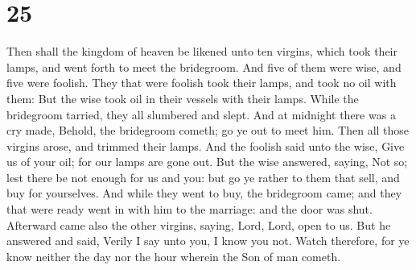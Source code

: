 \hypertarget{section-24}{%
\section{25}\label{section-24}}

 Then shall the kingdom of heaven be likened unto ten
virgins, which took their lamps, and went forth to meet the bridegroom.
 And five of them were wise, and five were foolish.
 They that were foolish took their lamps, and took no oil
with them:  But the wise took oil in their vessels with
their lamps.  While the bridegroom tarried, they all
slumbered and slept.  And at midnight there was a cry
made, Behold, the bridegroom cometh; go ye out to meet him.
 Then all those virgins arose, and trimmed their lamps.
 And the foolish said unto the wise, Give us of your oil;
for our lamps are gone out.  But the wise answered,
saying, Not so; lest there be not enough for us and you: but go ye
rather to them that sell, and buy for yourselves.  And
while they went to buy, the bridegroom came; and they that were ready
went in with him to the marriage: and the door was shut. 
Afterward came also the other virgins, saying, Lord, Lord, open to us.
 But he answered and said, Verily I say unto you, I know
you not.  Watch therefore, for ye know neither the day
nor the hour wherein the Son of man cometh.

